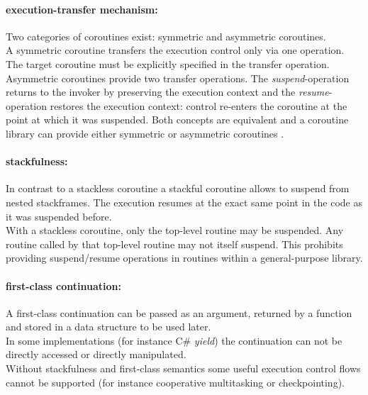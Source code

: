 \paragraph*{execution-transfer mechanism:}
Two categories of coroutines exist: symmetric and asymmetric coroutines.\\
\newline
A symmetric coroutine transfers the execution control only via one operation.
The target coroutine must be explicitly specified in the transfer operation.\\
\newline
Asymmetric coroutines provide two transfer operations.
The \textit{suspend}-operation returns to the invoker by preserving the
execution context and the \textit{resume}-operation restores the execution
context: control re-enters the coroutine at the point at which it was suspended.
Both concepts are equivalent and a coroutine library can provide either
symmetric or asymmetric coroutines \cite{Moura2009}.

\paragraph*{stackfulness:}
In contrast to a stackless coroutine a stackful coroutine allows to suspend
from nested stackframes. The execution resumes at the exact same point in the
code as it was suspended before.\\
With a stackless coroutine, only the top-level routine may be suspended. Any
routine called by that top-level routine may not itself suspend. This prohibits
providing suspend/resume operations in routines within a general-purpose library.

\paragraph*{first-class continuation:}
A first-class continuation can be passed as an argument, returned by a
function and stored in a data structure to be used later.\\
In some implementations (for instance C\# \textit{yield}) the continuation can
not be directly accessed or directly manipulated.\\
\newline
Without stackfulness and first-class semantics some useful execution control
flows cannot be supported (for instance cooperative multitasking or
checkpointing).

